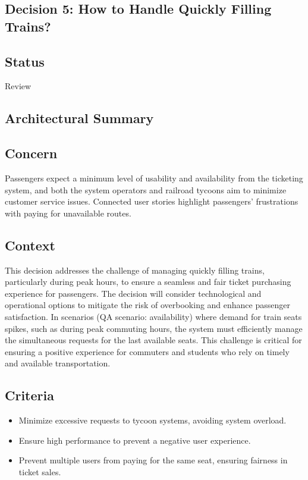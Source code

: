 \subsection{Decision 5: How to Handle Quickly Filling Trains?}

\subsection*{Status}
Review

\subsection*{Architectural Summary}

\subsection*{Concern}
Passengers expect a minimum level of usability and availability from the ticketing system, and both the system operators and railroad tycoons aim to minimize customer service issues. Connected user stories highlight passengers' frustrations with paying for unavailable routes.

\subsection*{Context}
This decision addresses the challenge of managing quickly filling trains, particularly during peak hours, to ensure a seamless and fair ticket purchasing experience for passengers. The decision will consider technological and operational options to mitigate the risk of overbooking and enhance passenger satisfaction.
In scenarios (QA scenario: availability) where demand for train seats spikes, such as during peak commuting hours, the system must efficiently manage the simultaneous requests for the last available seats. This challenge is critical for ensuring a positive experience for commuters and students who rely on timely and available transportation.

\subsection*{Criteria}
\begin{itemize}
    \item Minimize excessive requests to tycoon systems, avoiding system overload.
    \item Ensure high performance to prevent a negative user experience.
    \item Prevent multiple users from paying for the same seat, ensuring fairness in ticket sales.
\end{itemize}

